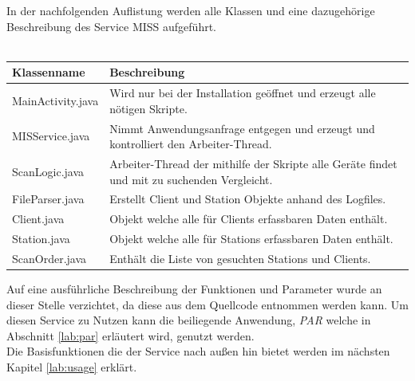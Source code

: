 \documentclass[]{report}
\begin{document}
In der nachfolgenden Auflistung werden alle Klassen und eine dazugehörige Beschreibung des Service MISS aufgeführt.\\ \\
\begin{center}
  \begin{tabulary}{\textwidth}{l | L}
  \toprule
  Klassenname & Beschreibung \\
  \midrule
  MainActivity.java & Wird nur bei der Installation geöffnet und erzeugt alle nötigen Skripte.\\
  MISService.java & Nimmt Anwendungsanfrage entgegen und erzeugt und kontrolliert den Arbeiter-Thread. \\
  ScanLogic.java & Arbeiter-Thread der mithilfe der Skripte alle Geräte findet und mit zu suchenden Vergleicht. \\
  FileParser.java & Erstellt Client und Station Objekte anhand des Logfiles. \\
  Client.java & Objekt welche alle für Clients erfassbaren Daten enthält. \\
  Station.java & Objekt welche alle für Stations erfassbaren Daten enthält. \\ 
  ScanOrder.java & Enthält die Liste von gesuchten Stations und Clients. \\
  \bottomrule
  \end{tabulary}  
\end{center}
Auf eine ausführliche Beschreibung der Funktionen und Parameter wurde an dieser Stelle verzichtet, da diese aus dem Quellcode entnommen werden kann. Um diesen Service zu Nutzen kann die beiliegende Anwendung, \textit{PAR} welche in Abschnitt \ref{lab:par} erläutert wird, genutzt werden. \\
Die Basisfunktionen die der Service nach außen hin bietet werden im nächsten Kapitel \ref{lab:usage} erklärt. 
\end{document}

